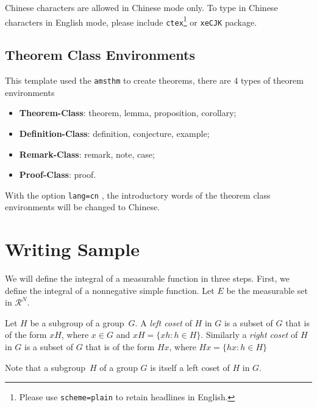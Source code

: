 \documentclass[en,hazy,blue,screen,14pt]{elegantnote}
\begin{document}
\begin{note}
Chinese characters are allowed in Chinese mode only. To type in Chinese characters in English mode, please include \lstinline{ctex}\footnote{Please use \lstinline{scheme=plain} to retain headlines in English.} or \lstinline{xeCJK} package.
\end{note}


\subsection{Theorem Class Environments}

This template used the \lstinline{amsthm} to create theorems, there are 4 types of theorem environments
\begin{itemize}
  \item \textbf{Theorem-Class}: theorem, lemma, proposition, corollary;
  \item \textbf{Definition-Class}: definition, conjecture, example;
  \item \textbf{Remark-Class}: remark, note, case;
  \item \textbf{Proof-Class}: proof.
\end{itemize}

\begin{remark}
With the option \lstinline{lang=cn} , the introductory words of the theorem class environments will be changed to Chinese.
\end{remark}


\section{Writing Sample}

We will define the integral of a measurable function in three steps. First, we define the integral of a nonnegative simple function. Let $E$ be the measurable set in $\mathcal{R}^N$.


\begin{definition}
Let $H$ be a subgroup of a group~$G$.  A \emph{left coset} of $H$ in $G$ is a subset of $G$ that is of the form $xH$, where $x \in G$ and $xH = \{ xh : h \in H \}$. Similarly a \emph{right coset} of $H$ in $G$ is a subset of $G$ that is of the form $Hx$, where $Hx = \{ hx : h \in H \}$
\end{definition}

Note that a subgroup~$H$ of a group $G$ is itself a left coset of $H$ in $G$.
\end{document}
